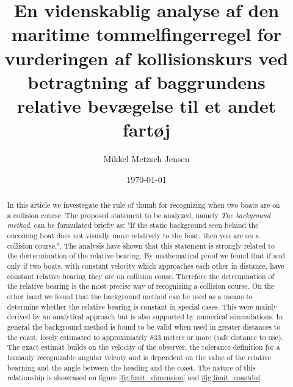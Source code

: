 \documentclass[%
 reprint,
nofootinbib,
aps,
]{revtex4-1}
\begin{document}
\title{En videnskablig analyse af den maritime tommelfingerregel for vurderingen af kollisionskurs ved betragtning af baggrundens relative bevægelse til et andet fartøj}
\author{Mikkel Metzsch Jensen}

\date{\today}


\begin{abstract}
  In this article we investegate the rule of thumb for recognizing when two boats are on a collision course. The proposed statement to be analyzed, namely \textit{The background method}, can be formulated briefly as: "If the static background seen behind the oncoming boat does not visually move relatively to the boat, then you are on a collision course.". The analysis have shown that this statement is strongly related to the dertermination of the relative bearing. By mathematical proof we found that if and only if two boats, with constant velocity which approaches each other in distance, have constant relative bearing they are on collision couse. Therefore the determination of the relative bearing is the most precise way of recognizing a collision course. On the other hand we found that the background method can be used as a means to determine whether the relative bearing is constant in special cases. This were mainly derived by an analytical approach but is also supported by numerical simmulations. In general the background method is found to be valid when used in greater distances to the coast, losely estimated to approximately 833 meters or more (safe distance to use). The exact estimat builds on the velocity of the observer, the tolerance definition for a humanly recognizable angular velcoty and is dependent on the value of the relative bearning and the angle between the heading and the coast. The nature of this relationship is showcased on figure \ref{fig:limit_dimension} and \ref{fig:limit_coastdis}.
\end{abstract}


\maketitle
\end{document}
